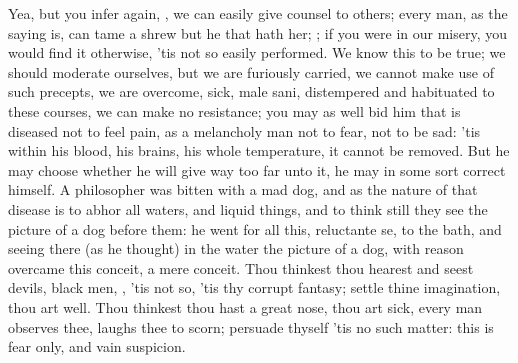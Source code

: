 {Yea, but you infer again, , we can easily
give counsel to others; every man, as the saying is, can tame a shrew
but he that hath her; ; if you were in our
misery, you would find it otherwise, 'tis not so easily performed. We
know this to be true; we should moderate ourselves, but we are
furiously carried, we cannot make use of such precepts, we are
overcome, sick, male sani, distempered and habituated to these courses,
we can make no resistance; you may as well bid him that is diseased not
to feel pain, as a melancholy man not to fear, not to be sad: 'tis
within his blood, his brains, his whole temperature, it cannot be
removed. But he may choose whether he will give way too far unto it, he
may in some sort correct himself. A philosopher was bitten with a mad
dog, and as the nature of that disease is to abhor all waters, and
liquid things, and to think still they see the picture of a dog before
them: he went for all this, reluctante se, to the bath, and seeing
there (as he thought) in the water the picture of a dog, with reason
overcame this conceit, 
a mere conceit. Thou thinkest thou hearest and seest devils,
black men, \etc{}, 'tis not so, 'tis thy corrupt fantasy; settle thine
imagination, thou art well. Thou thinkest thou hast a great nose, thou
art sick, every man observes thee, laughs thee to scorn; persuade
thyself 'tis no such matter: this is fear only, and vain suspicion.

}
